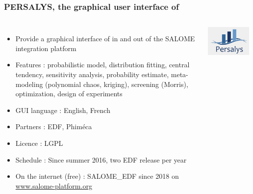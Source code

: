 \documentclass{beamer}
\begin{document}
\begin{frame}
\frametitle{PERSALYS, the graphical user interface of \ot{}}
	

  \begin{columns}
	
\begin{itemize}
\item Provide a graphical interface of 
\ot{} in and out of the SALOME integration platform
\item Features : probabilistic model, 
	distribution fitting, central tendency, 
        sensitivity analysis, probability estimate, 
	meta-modeling (polynomial chaos, kriging), screening (Morris), 
	optimization, design of experiments
\item GUI language : English, French

\item Partners : EDF, Phiméca
\item Licence : LGPL

\item Schedule : Since summer 2016, two EDF release per year
\item On the internet (free) : SALOME\_EDF since 2018 on 
\url{www.salome-platform.org}

\end{itemize}


\begin{center}
\includegraphics[width=0.95\textwidth]{figures/PERSALYS-LOGO.png}
\end{center}

	\end{columns}


\end{frame}
\end{document}
